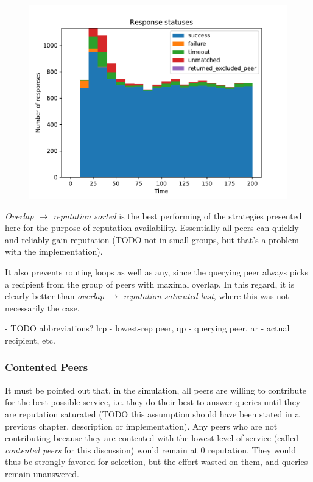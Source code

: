 \begin{figure}[t]
\centering
\includegraphics[width=1\columnwidth]{figures/selection_overlap_rep_sorted_resp_statuses}
\label{fig:selection_overlap_rep_sorted_resp_statuses}
\end{figure}

\emph{Overlap $\rightarrow$ reputation sorted} is the best performing of the
strategies presented here for the purpose of reputation availability.
Essentially all peers can quickly and reliably gain reputation (TODO not in
small groups, but that's a problem with the implementation).

It also prevents routing loops as well as any, since the querying peer always
picks a recipient from the group of peers with maximal overlap. In this regard,
it is clearly better than \emph{overlap $\rightarrow$ reputation saturated
last}, where this was not necessarily the case.

- TODO abbreviations? lrp - lowest-rep peer, qp - querying peer, ar - actual
  recipient, etc.

\subsubsection{Contented Peers}
\label{sec:rep_avail_selection_rep_sorted_contented}
It must be pointed out that, in the simulation, all peers are willing to
contribute for the best possible service, i.e. they do their best to answer
queries until they are reputation saturated (TODO this assumption should have
been stated in a previous chapter, description or implementation). Any peers who
are not contributing because they are contented with the lowest level of service
(called \emph{contented peers} for this discussion) would remain at 0
reputation. They would thus be strongly favored for selection, but the effort
wasted on them, and queries remain unanswered.

